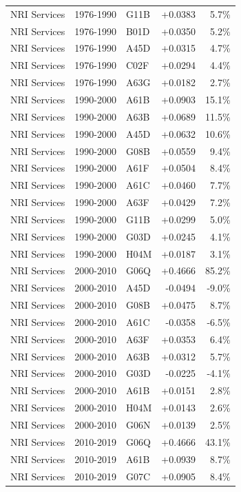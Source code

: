 \begin{tabular}{lllrr}
NRI Services & 1976-1990 & G11B & +0.0383 & 5.7\% \\
NRI Services & 1976-1990 & B01D & +0.0350 & 5.2\% \\
NRI Services & 1976-1990 & A45D & +0.0315 & 4.7\% \\
NRI Services & 1976-1990 & C02F & +0.0294 & 4.4\% \\
NRI Services & 1976-1990 & A63G & +0.0182 & 2.7\% \\
NRI Services & 1990-2000 & A61B & +0.0903 & 15.1\% \\
NRI Services & 1990-2000 & A63B & +0.0689 & 11.5\% \\
NRI Services & 1990-2000 & A45D & +0.0632 & 10.6\% \\
NRI Services & 1990-2000 & G08B & +0.0559 & 9.4\% \\
NRI Services & 1990-2000 & A61F & +0.0504 & 8.4\% \\
NRI Services & 1990-2000 & A61C & +0.0460 & 7.7\% \\
NRI Services & 1990-2000 & A63F & +0.0429 & 7.2\% \\
NRI Services & 1990-2000 & G11B & +0.0299 & 5.0\% \\
NRI Services & 1990-2000 & G03D & +0.0245 & 4.1\% \\
NRI Services & 1990-2000 & H04M & +0.0187 & 3.1\% \\
NRI Services & 2000-2010 & G06Q & +0.4666 & 85.2\% \\
NRI Services & 2000-2010 & A45D & -0.0494 & -9.0\% \\
NRI Services & 2000-2010 & G08B & +0.0475 & 8.7\% \\
NRI Services & 2000-2010 & A61C & -0.0358 & -6.5\% \\
NRI Services & 2000-2010 & A63F & +0.0353 & 6.4\% \\
NRI Services & 2000-2010 & A63B & +0.0312 & 5.7\% \\
NRI Services & 2000-2010 & G03D & -0.0225 & -4.1\% \\
NRI Services & 2000-2010 & A61B & +0.0151 & 2.8\% \\
NRI Services & 2000-2010 & H04M & +0.0143 & 2.6\% \\
NRI Services & 2000-2010 & G06N & +0.0139 & 2.5\% \\
NRI Services & 2010-2019 & G06Q & +0.4666 & 43.1\% \\
NRI Services & 2010-2019 & A61B & +0.0939 & 8.7\% \\
NRI Services & 2010-2019 & G07C & +0.0905 & 8.4\% \\

\end{tabular}
